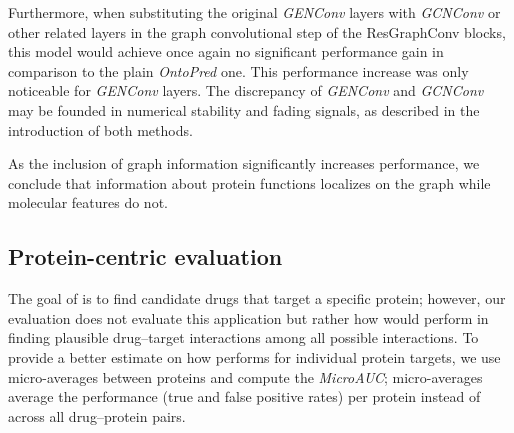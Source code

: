 \documentclass{bioinfo}
\begin{document}
Furthermore, when substituting the original \textit{GENConv} layers with \textit{GCNConv} or other related layers in the graph convolutional step of the ResGraphConv blocks, this model would achieve once again no significant performance gain in comparison to the plain \textit{OntoPred} one. This performance increase was only noticeable for \textit{GENConv} layers. The discrepancy of \textit{GENConv} and \textit{GCNConv} may be founded in numerical stability and fading signals, as described in the introduction of both methods. 

As the inclusion of graph information significantly
increases performance, we conclude that information about protein
functions localizes on the graph while molecular features do not.










\subsection{Protein-centric evaluation}
The goal of \name is to find candidate drugs that target a specific
protein; however, our evaluation does not evaluate this application
but rather how \name would perform in finding plausible drug--target
interactions among all possible interactions. To provide a better
estimate on how \name performs for individual protein targets, we use
micro-averages between proteins and compute the \textit{MicroAUC};
micro-averages average the performance (true and false positive rates)
per protein instead of across all drug--protein pairs.

\end{document}
